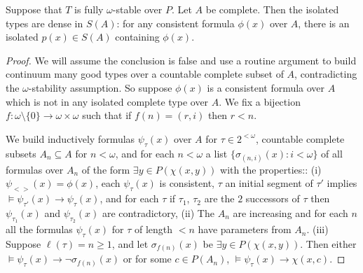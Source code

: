 \documentclass[10pt,a4paper]{amsart}
\begin{document}
\begin{Proposition} Suppose that $T$ is fully $\omega$-stable over $P$. Let $A$ be complete. Then the isolated types are dense in $S(A)$: for any consistent formula $\phi(x)$ over $A$, there is an isolated $p(x)\in S(A)$ containing $\phi(x)$.
\end{Proposition}

\begin{proof} We will assume the conclusion is false and use a routine argument to build continuum many good types over a countable complete subset of $A$, contradicting the $\omega$-stability assumption. 
So suppose $\phi(x)$ is a consistent formula over $A$ which is not in any isolated complete type over $A$.  We fix a bijection $f: \omega\setminus \{0\} \to \omega\times \omega$ such that if $f(n) = (r,i)$ then $r < n$. 

We build inductively formulas  $\psi_{\tau}(x)$ over $A$ for $\tau\in 2^{<\omega}$, countable complete subsets $A_{n}\subseteq A$ for $n<\omega$, and for each $n<\omega$ a list $\{\sigma_{(n,i)}(x): i<\omega\}$ of all formulas over $A_{n}$ of the form $\exists y \in P(\chi(x,y))$ with the properties::
\newline
(i)  $\psi_{<>}(x) = \phi(x)$, each $\psi_{\tau}(x)$ is consistent,   $\tau$ an initial segment of $\tau'$ implies $\models \psi_{\tau '}(x) \to \psi_{\tau}(x)$, and for each $\tau$ if $\tau_{1}$, $\tau_{2}$ are the $2$ successors of $\tau$ then $\psi_{\tau_{1}}(x)$ and $\psi_{\tau_{2}}(x)$ are contradictory,
\newline
(ii)  The $A_{n}$ are increasing and for each $n$ all the formulas $\psi_{\tau}(x)$ for $\tau$ of length $< n$  have parameters from $A_{n}$.
\newline
(iii)  Suppose $\ell(\tau) = n\geq 1$, and let $\sigma_{f(n)}(x)$ be $\exists y\in P (\chi(x,y))$. Then either $\models \psi_{\tau}(x) \to \neg\sigma_{f(n)}(x)$ or for some $c\in P(A_{n})$, $\models \psi_{\tau}(x) \to \chi(x,c)$. 


\end{proof}
\end{document}
